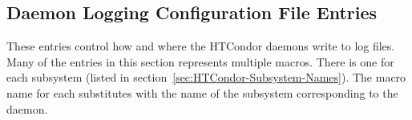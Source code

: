 \begin{description}
\end{description}


\subsection{\label{sec:Daemon-Logging-Config-File-Entries}Daemon Logging Configuration File Entries} 

These entries control how and where the HTCondor daemons write to log
files.  Many of the entries in this section represents multiple
macros. There is one for each subsystem (listed
in section~\ref{sec:HTCondor-Subsystem-Names}).
The macro name for each substitutes  with the name
of the subsystem corresponding to the daemon.
